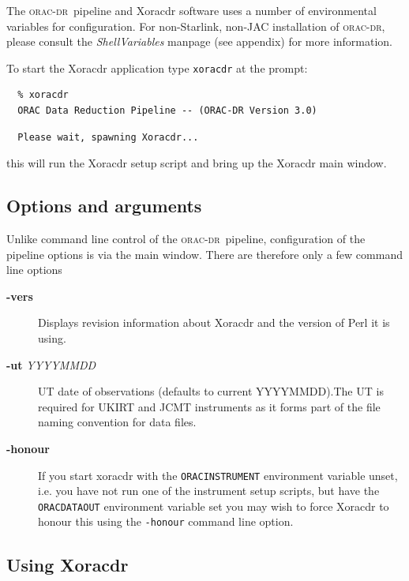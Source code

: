 \documentclass[twoside,11pt]{article}
\renewcommand{\_}{\texttt{\symbol{95}}}
\newcommand{\oracdr}{\textsc{orac-dr}}
\begin{document}
The \oracdr\ pipeline and Xoracdr software uses a number of
environmental variables for configuration. For non-Starlink, non-JAC
installation of \oracdr, please consult the \emph{ShellVariables} manpage (see
appendix) for more information.



To start the Xoracdr application type \texttt{xoracdr} at the prompt:

\begin{verbatim}
  % xoracdr
  ORAC Data Reduction Pipeline -- (ORAC-DR Version 3.0)
\end{verbatim}
\begin{verbatim}
  Please wait, spawning Xoracdr...
\end{verbatim}


this will run the Xoracdr setup script and bring up the Xoracdr main window.

\subsection*{Options and arguments\label{Xoracdr_OPTIONS_AND_ARGUMENTS}}

Unlike command line control of the \oracdr\ pipeline, configuration of
the pipeline options is via the main window. There are therefore only
a few command line options

\begin{description}
\item[\textbf{-vers}] \mbox{}

Displays revision information about Xoracdr and the version of Perl it
is using.

\item[\textbf{-ut} \textit{YYYYMMDD}] \mbox{}

UT date of observations (defaults to current YYYYMMDD).The UT is
required for UKIRT and JCMT instruments as it forms part of the file
naming convention for data files.

\item[\textbf{-honour}] \mbox{}

If you start xoracdr with the \texttt{ORAC\_INSTRUMENT} environment variable
unset, i.e. you have not run one of the instrument setup scripts, but
have the \texttt{ORAC\_DATA\_OUT} environment variable set you may wish to
force Xoracdr to honour this using the \texttt{-honour} command line option.

\end{description}
\subsection*{Using Xoracdr\label{Xoracdr_USING_XORACDR}}
\end{document}
